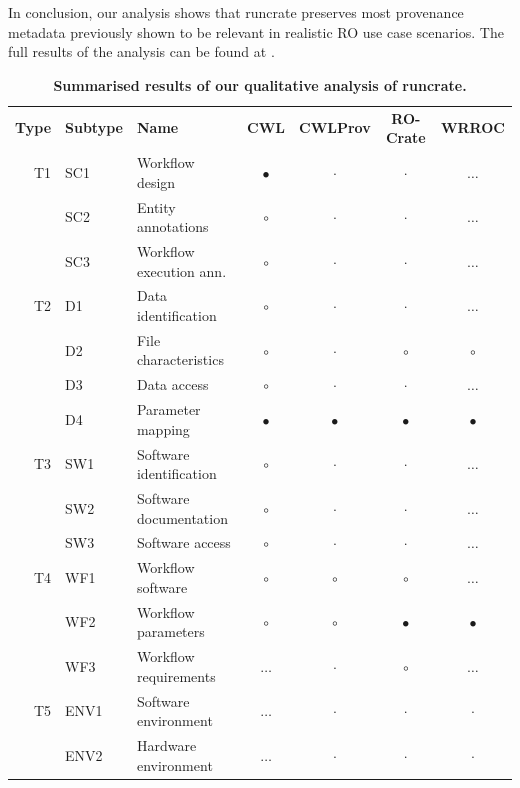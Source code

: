 \documentclass[10pt,letterpaper]{article}
\newlength\savedwidth
\newcommand\thickhline{\noalign{\global\savedwidth\arrayrulewidth\global\arrayrulewidth 2pt}%
\hline
\noalign{\global\arrayrulewidth\savedwidth}}
\begin{document}
In conclusion, our analysis shows that runcrate preserves most provenance metadata previously shown to be relevant in realistic RO use case scenarios.
The full results of the analysis can be found at \cite{de Wit 2023}.


\begin{table}[!ht]
\begin{adjustwidth}{-1.4cm}{0in} %
\centering
\caption{
{\bf Summarised results of our qualitative analysis of runcrate.}}
\begin{tabular}{r|l|l|c|c|c|c}
\hline
{\bf Type} & {\bf Subtype} & {\bf Name} & {\bf CWL} & {\bf CWLProv} & {\bf RO-Crate} & {\bf WRROC}  \\ \thickhline
T1 & SC1 & Workflow design & $\bullet$ &  $\cdot$  &  $\cdot$ & $\dots$ \\ 
& SC2 & Entity annotations & $\circ$ &  $\cdot$  &  $\cdot$  & $\dots$ \\ 
& SC3 & Workflow execution ann.  &  $\circ$  & $\cdot$ &  $\cdot$ & $\dots$ \\ \hline
T2 & D1 & Data identification & $\circ$ & $\cdot$ &  $\cdot$ & $\dots$ \\
& D2 & File characteristics & $\circ$ & $\cdot$ & $\circ$ & $\circ$ \\
& D3 & Data access & $\circ$ &  $\cdot$  &  $\cdot$  & $\dots$ \\ 
& D4 & Parameter mapping & $\bullet$ & $\bullet$ & $\bullet$ & $\bullet$ \\ \hline 
T3 & SW1 & Software identification & $\circ$ &  $\cdot$ & $\cdot$ & $\dots$ \\ 
& SW2 & Software documentation & $\circ$ &  $\cdot$ & $\cdot$ & $\dots$ \\  
& SW3 & Software access & $\circ$ &  $\cdot$ & $\cdot$ & $\dots$ \\ \hline 
T4 & WF1 & Workflow software & $\circ$ & $\circ$ & $\circ$ & $\dots$ \\ 
& WF2 & Workflow parameters & $\circ$ & $\circ$ & $\bullet$ & $\bullet$ \\ 
& WF3 & Workflow requirements & $\dots$ &  $\cdot$  &  $\circ$  & $\dots$ \\ \hline 
T5 & ENV1 & Software environment & $\dots$ & $\cdot$ &  $\cdot$ & $\cdot$ \\ 
& ENV2 & Hardware environment & $\dots$ & $\cdot$ &  $\cdot$  & $\cdot$\\ 

\end{tabular}
\end{adjustwidth}
\end{table}
\end{document}
